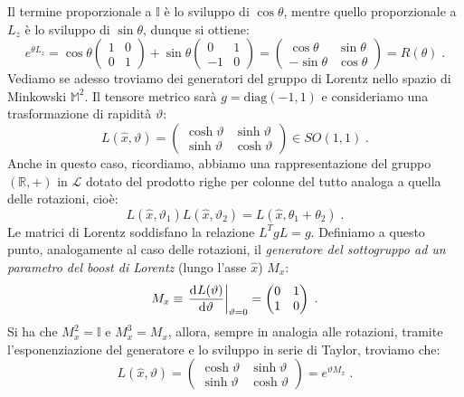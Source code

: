 Il termine proporzionale a $\mathbb{I}$ è lo sviluppo di $\cos\theta$, mentre quello proporzionale a $L_z$ è lo sviluppo di $\sin\theta$,
 dunque si ottiene:
\begin{equation}
e^{\theta L_z} =\cos\theta\begin{pmatrix}
1 & 0 \\
0 & 1
\end{pmatrix}+\sin\theta\begin{pmatrix}
0 & 1 \\
-1 & 0
\end{pmatrix}=\begin{pmatrix}
\cos\theta & \sin\theta \\
-\sin\theta & \cos\theta
\end{pmatrix}=R(\theta)\;.
\end{equation} 
 Vediamo se adesso troviamo dei generatori del gruppo di Lorentz nello spazio di Minkowski $\mathbb{M}^2$. Il tensore metrico sarà $g=
\mathrm{diag}(-1,1)$ e consideriamo una trasformazione di rapidità $\vartheta$:
\begin{equation}
L(\hat{x},\vartheta)=\begin{pmatrix}
\cosh\vartheta & \sinh\vartheta \\
\sinh\vartheta & \cosh\vartheta
\end{pmatrix}\in SO(1,1)\;.
\end{equation}
Anche in questo caso, ricordiamo, abbiamo una rappresentazione del gruppo $(\mathbb{R},+)$ in $\mathcal{L}$ dotato del prodotto righe 
per colonne del tutto analoga a quella delle rotazioni, cioè:
\begin{equation}
L(\hat{x},\vartheta_1)L(\hat{x},\vartheta_2)=L(\hat{x},\theta_1+\theta_2)\;.
\end{equation}
Le matrici di Lorentz soddisfano la relazione $L^TgL=g$. Definiamo a questo punto, analogamente al caso delle rotazioni, il 
\textit{generatore del sottogruppo ad un parametro del boost di Lorentz} (lungo l'asse $\hat{x}$) $M_x$:
\begin{equation}
M_x \equiv\left.\frac{\mathrm{d}^{}L(\vartheta)}{\mathrm{d}\vartheta^{}}\right|_{\vartheta=0}=\begin{pmatrix}
0 & 1 \\
1 &0
\end{pmatrix}\;.
\end{equation}
Si ha che $M_x^2=\mathbb{I}$ e $M_x^3=M_x$, allora, sempre in analogia alle rotazioni, tramite l'esponenziazione del generatore e lo sviluppo in serie di Taylor, troviamo che:
\begin{equation}
L(\hat{x},\vartheta)=\begin{pmatrix}
\cosh\vartheta & \sinh\vartheta \\
\sinh\vartheta & \cosh\vartheta
\end{pmatrix}=e^{\vartheta M_x}\;.
\end{equation}
